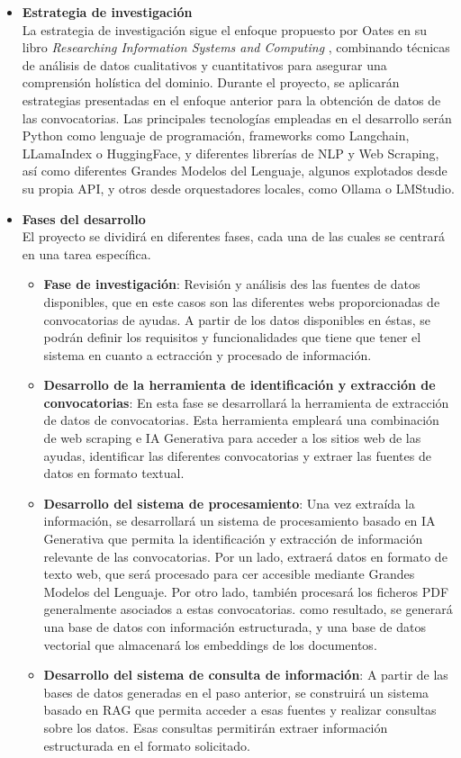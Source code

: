 \begin{itemize}
\item \textbf{Estrategia de investigación}\\
La estrategia de investigación sigue el enfoque propuesto por Oates en su libro \textit{Researching
Information Systems and Computing} \cite{Oates2005ResearchingIS}, combinando técnicas de análisis de datos cualitativos
y cuantitativos para asegurar una comprensión holística del dominio.
Durante el proyecto, se aplicarán estrategias presentadas en el enfoque anterior para la obtención de datos de las convocatorias.
Las principales tecnologías empleadas en el desarrollo serán Python como lenguaje de programación, frameworks como Langchain, LLamaIndex o HuggingFace, y diferentes librerías de NLP y Web Scraping, así como diferentes Grandes Modelos del Lenguaje, algunos explotados desde su propia API, y otros desde orquestadores locales, como Ollama o LMStudio.
    
\item \textbf{Fases del desarrollo}\\
El proyecto se dividirá en diferentes fases, cada una de las cuales se centrará en una tarea específica.
    
\begin{itemize}
    \item \textbf{Fase de investigación}:
    Revisión y análisis des las fuentes de datos disponibles, que en este casos son las diferentes webs proporcionadas de convocatorias de ayudas.
    A partir de los datos disponibles en éstas, se podrán definir los requisitos y funcionalidades que tiene que tener el sistema en cuanto a ectracción y procesado de información.
        
    \item \textbf{Desarrollo de la herramienta de identificación y extracción de convocatorias}:
    En esta fase se desarrollará la herramienta de extracción de datos de convocatorias. Esta herramienta empleará una combinación de web scraping e IA Generativa para acceder a los sitios web de las ayudas, identificar las diferentes convocatorias y extraer las fuentes de datos en formato textual.

    \item \textbf{Desarrollo del sistema de procesamiento}:
    Una vez extraída la información, se desarrollará un sistema de procesamiento basado en IA Generativa que permita la identificación y extracción de información relevante de las convocatorias.
    Por un lado, extraerá datos en formato de texto web, que será procesado para cer accesible mediante Grandes Modelos del Lenguaje. Por otro lado, también procesará los ficheros PDF generalmente asociados a estas convocatorias.
    como resultado, se generará una base de datos con información estructurada, y una base de datos vectorial que almacenará los embeddings de los documentos.
    \item \textbf{Desarrollo del sistema de consulta de información}:
    A partir de las bases de datos generadas en el paso anterior, se construirá un sistema basado en RAG que permita acceder a esas fuentes y realizar consultas sobre los datos.
    Esas consultas permitirán extraer información estructurada en el formato solicitado.
    

\end{itemize}
\end{itemize}
